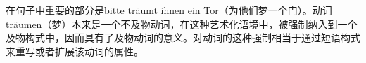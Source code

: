 在句子中重要的部分是bitte träumt ihnen ein Tor（为他们梦一个门）。动词träumen（梦）本来是一个不及物动词，在这种艺术化语境中，被强制纳入到一个及物构式中，因而具有了及物动词的意义。对动词的这种强制相当于通过短语构式来重写或者扩展该动词的属性。

